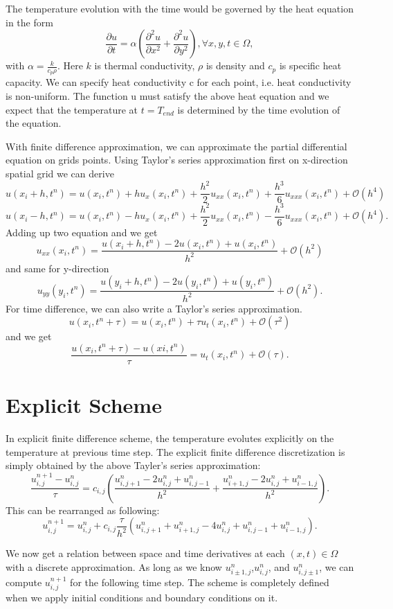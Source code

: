 \documentclass[10pt,a4paper]{report}
\begin{document}
The temperature evolution with the time would be governed by the heat equation in the form \[{\frac{\partial u}{\partial t}}=\alpha({\frac{\partial^2 u}{\partial x^2}}+{\frac{\partial^2 u}{\partial y^2}}),\forall{x,y,t}\in \Omega,\]with $\alpha = {\frac{k}{c_p \rho}}$. Here $k$ is thermal conductivity, $\rho$ is density and $c_p$ is specific heat capacity. 
We can specify heat conductivity c for each point, i.e. heat conductivity is non-uniform. The function u must satisfy the above heat equation and we expect that the temperature at $t=T_{end}$ is determined by the time evolution of the equation.

With finite difference approximation, we can approximate the partial differential equation on grids points. Using Taylor's series approximation first on x-direction spatial grid we can derive
\[u(x_i+h,t^n)=u(x_i,t^n)+hu_x(x_i,t^n)+{\frac{h^2}{2}}u_{xx}(x_i,t^n)+{\frac{h^3}{6}}u_{xxx}(x_i,t^n)+\mathcal{O}(h^4)\]
\[u(x_i-h,t^n)=u(x_i,t^n)-hu_x(x_i,t^n)+{\frac{h^2}{2}}u_{xx}(x_i,t^n)-{\frac{h^3}{6}}u_{xxx}(x_i,t^n)+\mathcal{O}(h^4) .\]
Adding up two equation and we get
\[u_{xx}(x_i,t^n)={\frac{u(x_i+h,t^n)-2u(x_i,t^n)+u(x_i,t^n)}{h^2}}+\mathcal{O}(h^2)\]
and same for y-direction
\[u_{yy}(y_i,t^n)={\frac{u(y_i+h,t^n)-2u(y_i,t^n)+u(y_i,t^n)}{h^2}}+\mathcal{O}(h^2).\]
For time difference, we can also write a Taylor's series approximation.
\[u(x_i,t^n+\tau)=u(x_i,t^n)+\tau u_t(x_i,t^n)+\mathcal{O}(\tau^2) \]and we get \[{\frac{u(x_i,t^n+\tau)-u(xi,t^n)}{\tau}}=u_t(x_i,t^n)+\mathcal{O}(\tau).\] 

\section{Explicit Scheme}

In explicit finite difference scheme, the temperature evolutes explicitly on the temperature at previous time step. The explicit finite difference discretization is simply obtained by the above Tayler's series approximation: \[{\frac{u^{n+1}_{i,j}-u^n_{i,j}}{\tau}}=c_{i,j}({\frac{u^n_{i,j+1}-2u^n_{i,j}+u^n_{i,j-1}}{h^2}}+{\frac{u^n_{i+1,j}-2u^n_{i,j}+u^n_{i-1,j}}{h^2}}).\]
This can be rearranged as following:\[u^{n+1}_{i,j}=u^{n}_{i,j}+c_{i,j}{\frac{\tau}{h^2}}(u^n_{i,j+1}+u^n_{i+1,j}-4u^n_{i,j}+u^n_{i,j-1}+u^n_{i-1,j}).\]

We now get a relation between space and time derivatives at each $(x,t)\in \Omega$ with a discrete approximation. As long as we know $u^n_{i\pm 1,j}$,$u^n_{i,j}$, and $u^n_{i,j\pm 1}$, we can compute $u^{n+1}_{i,j}$ for the following time step. The scheme is completely defined when we apply initial conditions and boundary conditions on it.
\end{document}
